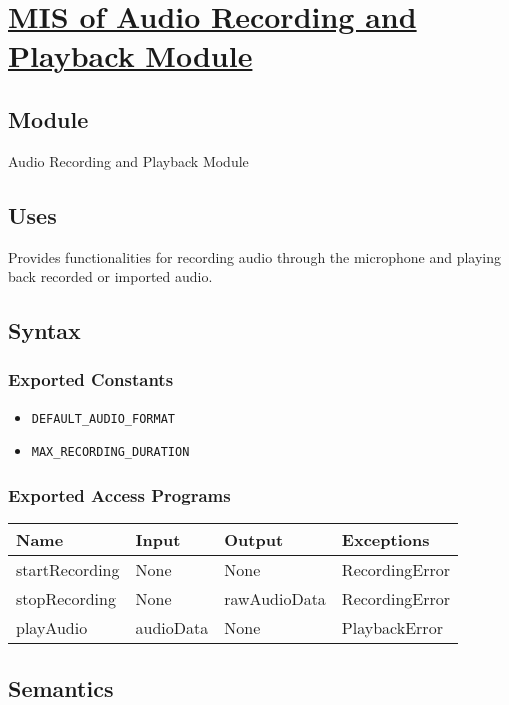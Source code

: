 \documentclass[12pt, titlepage]{article}
\begin{document}
\section{\hyperref[mARP]{MIS of Audio Recording and Playback Module}} \label{M7}  

\subsection{Module}  
Audio Recording and Playback Module  

\subsection{Uses}  
Provides functionalities for recording audio through the microphone and playing 
back recorded or imported audio.

\subsection{Syntax}  

\subsubsection{Exported Constants}  
\begin{itemize}
    \item \texttt{DEFAULT\_AUDIO\_FORMAT}  
    \item \texttt{MAX\_RECORDING\_DURATION}  
\end{itemize}  

\subsubsection{Exported Access Programs}  
\begin{center}  
\begin{tabular}{|p{3cm}|p{4cm}|p{4cm}|p{3.5cm}|}  
\hline  
\textbf{Name} & \textbf{Input} & \textbf{Output} & \textbf{Exceptions} \\  
\hline  
startRecording & None & None & RecordingError \\  
stopRecording & None & rawAudioData & RecordingError \\  
playAudio & audioData & None & PlaybackError \\  
\hline  
\end{tabular}  
\end{center}  

\subsection{Semantics}  
\end{document}

